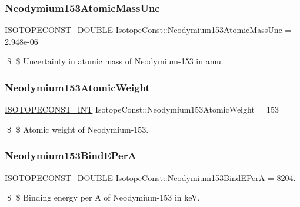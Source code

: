 \subsubsection{\texorpdfstring{Neodymium153\+Atomic\+Mass\+Unc}{Neodymium153AtomicMassUnc}}
{\footnotesize\ttfamily \mbox{\hyperlink{group___isotope_const-_macros_ga8f45a7272ce02c0b4c65c44636ed719a}{I\+S\+O\+T\+O\+P\+E\+C\+O\+N\+S\+T\+\_\+\+D\+O\+U\+B\+LE}} Isotope\+Const\+::\+Neodymium153\+Atomic\+Mass\+Unc = 2.\+948e-\/06}

\$ \$ Uncertainty in atomic mass of Neodymium-\/153 in amu. \mbox{\label{group___isotope_const-_neodymium-_nd153_ga2b3a676d30e8ae7c9735226bb5f3b8c5}} 
\subsubsection{\texorpdfstring{Neodymium153\+Atomic\+Weight}{Neodymium153AtomicWeight}}
{\footnotesize\ttfamily \mbox{\hyperlink{group___isotope_const-_macros_ga5f18360b3e99483a35c32d789e62621c}{I\+S\+O\+T\+O\+P\+E\+C\+O\+N\+S\+T\+\_\+\+I\+NT}} Isotope\+Const\+::\+Neodymium153\+Atomic\+Weight = 153}

\$ \$ Atomic weight of Neodymium-\/153. \mbox{\label{group___isotope_const-_neodymium-_nd153_ga596698d1edf4c9465f4f4944c4260bc7}} 
\subsubsection{\texorpdfstring{Neodymium153\+Bind\+E\+PerA}{Neodymium153BindEPerA}}
{\footnotesize\ttfamily \mbox{\hyperlink{group___isotope_const-_macros_ga8f45a7272ce02c0b4c65c44636ed719a}{I\+S\+O\+T\+O\+P\+E\+C\+O\+N\+S\+T\+\_\+\+D\+O\+U\+B\+LE}} Isotope\+Const\+::\+Neodymium153\+Bind\+E\+PerA = 8204.}

\$ \$ Binding energy per A of Neodymium-\/153 in keV. \mbox{\label{group___isotope_const-_neodymium-_nd153_gae420a9f3ede32e5767e913d9827c72f8}} 
